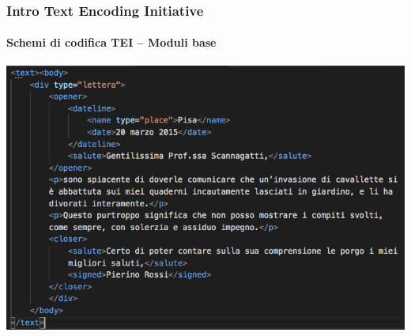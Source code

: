



\begin{frame}
	\frametitle{Intro Text Encoding Initiative}
	\framesubtitle{Schemi di codifica TEI – Moduli base}
	\addtocounter{nframe}{1}        
	   
	\begin{center}
		\includegraphics[width=.9\textwidth]{imgs/esLettera.png}
	\end{center}


\end{frame}





